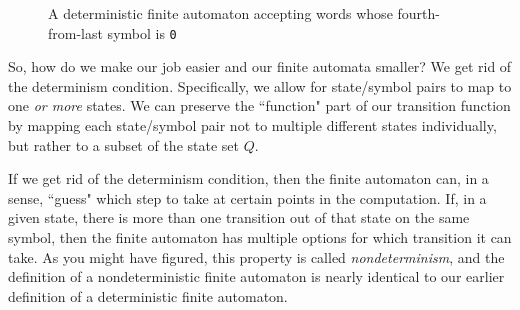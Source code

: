 \begin{figure}[p!]
\caption{A deterministic finite automaton accepting words whose fourth-from-last symbol is \texttt{0}}
\label{fig:deterministicfourthfromlast}
\end{figure}

So, how do we make our job easier and our finite automata smaller? We get rid of the determinism condition. Specifically, we allow for state/symbol pairs to map to one \emph{or more} states. We can preserve the ``function" part of our transition function by mapping each state/symbol pair not to multiple different states individually, but rather to a subset of the state set $Q$.

If we get rid of the determinism condition, then the finite automaton can, in a sense, ``guess" which step to take at certain points in the computation. If, in a given state, there is more than one transition out of that state on the same symbol, then the finite automaton has multiple options for which transition it can take. As you might have figured, this property is called \emph{nondeterminism}, and the definition of a nondeterministic finite automaton is nearly identical to our earlier definition of a deterministic finite automaton.

